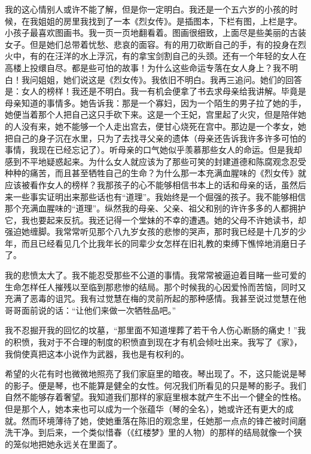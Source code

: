 \par 我的这心情别人或许不能了解，但是你一定明白。我还是一个五六岁的小孩的时候，在我姐姐的房里我找到了一本《烈女传》。是插图本，下栏有图，上栏是字。小孩子最喜欢图画书。我一页一页地翻看着。图画很细致，上面尽是些美丽的古装女子。但是她们总带着忧愁、悲哀的面容。有的用刀砍断自己的手，有的投身在烈火中，有的在汪洋的水上浮沉，有的拿宝剑割自己的头颈。还有一个年轻的女人在高楼上投缳自尽。都是些可怕的故事！为什么这些命运专落在女人身上？我不明白！我问姐姐，她们说这是《烈女传》。我依旧不明白。我再三追问。她们的回答是：女人的榜样！我还是不明白。我一有机会便拿了书去求母亲给我讲解。毕竟是母亲知道的事情多。她告诉我：那是一个寡妇，因为一个陌生的男子拉了她的手，她便当着那个人把自己这只手砍下来。这是一个王妃，宫里起了火灾，但是陪伴她的人没有来，她不能够一个人走出宫去，便甘心烧死在宫中。那边是一个孝女，她把自己的身子沉在水里，只为了去找寻父亲的遗体（母亲还告诉我许多许多可怕的事情，我现在已经忘记了）。听母亲的口气她似乎羡慕那些女人的命运。但是我却感到不平地疑惑起来。为什么女人就应该为了那些可笑的封建道德和陈腐观念忍受种种的痛苦，而且甚至牺牲自己的生命？为什么那一本充满血腥味的《烈女传》就应该被看作女人的榜样？我那孩子的心不能够相信书本上的话和母亲的话，虽然后来一些事实证明出来那些话也有“道理”。我始终是一个倔强的孩子。我不能够相信那个充满血腥味的“道理”。纵然我的母亲、父亲、祖父和别的许许多多的人都拥护它，我也要起来反抗。我还记得一个堂妹的不幸的遭遇。她的父母不许她读书，却强迫她缠脚。我常常听见那个八九岁女孩的悲惨的哭声，那时我已经是十几岁的少年，而且已经看见几个比我年长的同辈少女怎样在旧礼教的束缚下憔悴地消磨日子了。
\par 我的悲愤太大了。我不能忍受那些不公道的事情。我常常被逼迫着目睹一些可爱的生命怎样任人摧残以至临到那悲惨的结局。那个时候我的心因爱怜而苦恼，同时又充满了恶毒的诅咒。我有过觉慧在梅的灵前所起的那种感情。我甚至说过觉慧在他哥哥面前说的话：“让他们来做一次牺牲品吧。”
\par 我不忍掘开我的回忆的坟墓，“那里面不知道埋葬了若干令人伤心断肠的痛史！”我的积愤，我对于不合理的制度的积愤直到现在才有机会倾吐出来。我写了《家》，我倘使真把这本小说作为武器，我也是有权利的。
\par 希望的火花有时也微微地照亮了我们家庭里的暗夜。琴出现了。不，这只能说是琴的影子。便是琴，也不能算是健全的女性。何况我们所看见的只是琴的影子。我们自然不能够存着奢望。我知道我们那样的家庭里根本就产生不出一个健全的性格。但是那个人，她本来也可以成为一个张蕴华（琴的全名），她或许还有更大的成就。然而环境薄待了她，使她重落在陈旧的观念里，任她那一点点的锋芒被时间磨洗干净。到后来，一个类似惜春（《红楼梦》里的人物）的那样的结局就像一个狭的笼似地把她永远关在里面了。
